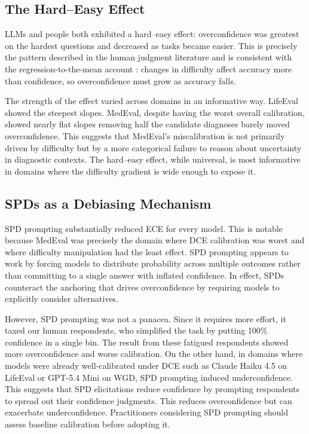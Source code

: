 \documentclass{article}
\begin{document}
\subsection{The Hard--Easy Effect}

LLMs and people both exhibited a hard--easy effect: overconfidence was greatest on the hardest questions and decreased as tasks became easier. This is precisely the pattern described in the human judgment literature \citep{Lichtenstein_Fischhoff_1977} and is consistent with the regression-to-the-mean account \citep{Erev_1994}: changes in difficulty affect accuracy more than confidence, so overconfidence must grow as accuracy falls.

The strength of the effect varied across domains in an informative way. LifeEval showed the steepest slopes. MedEval, despite having the worst overall calibration, showed nearly flat slopes removing half the candidate diagnoses barely moved overconfidence. This suggests that MedEval's miscalibration is not primarily driven by difficulty but by a more categorical failure to reason about uncertainty in diagnostic contexts. The hard--easy effect, while universal, is most informative in domains where the difficulty gradient is wide enough to expose it.

\subsection{SPDs as a Debiasing Mechanism}

SPD prompting substantially reduced ECE for every model. This is notable because MedEval was precisely the domain where DCE calibration was worst and where difficulty manipulation had the least effect. SPD prompting appears to work by forcing models to distribute probability across multiple outcomes rather than committing to a single answer with inflated confidence. In effect, SPDs counteract the anchoring that drives overconfidence by requiring models to explicitly consider alternatives.

However, SPD prompting was not a panacea. Since it requires more effort, it taxed our human respondents, who simplified the task by putting 100\% confidence in a single bin. The result from these fatigued respondents showed more overconfidence and worse calibration. On the other hand, in domains where models were already well-calibrated under DCE such as Claude Haiku 4.5 on LifeEval or GPT-5.4 Mini on WGD, SPD prompting induced underconfidence. This suggests that SPD elicitations reduce confidence by prompting respondents to spread out their confidence judgments. This reduces overconfidence but can exacerbate underconfidence. Practitioners considering SPD prompting should assess baseline calibration before adopting it.
\end{document}
